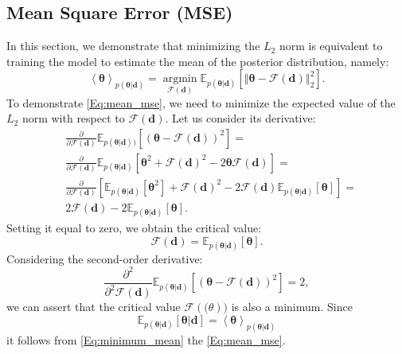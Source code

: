 \documentclass{aa}
\begin{document}
\begin{appendix}
\section{Mean Square Error (MSE)}\label{Sec:appendix_Mean Square Error}
In this section, we demonstrate that minimizing the $L_2$ norm is equivalent to training the model to estimate the mean of the posterior distribution, namely:
\begin{equation}\label{Eq:mean_mse}
\left \langle \bm {\theta} \right \rangle_{p(\bm {\theta}|\bm{d})}=\operatorname*{argmin}_{\mathcal{F}(\bm{d})}\mathbb{E}_{p(\bm {\theta}|\bm {d})}[\left\Vert \bm {\theta}-\mathcal{F}(\bm{d})
 \right \Vert_{2}^{2}].
\end{equation}
To demonstrate \autoref{Eq:mean_mse}, we need to minimize the expected value of the $L_2$ norm with respect to $\mathcal{F}(\bm{d})$. Let us consider its derivative:
\begin{align}\label{Eq:moment_1}
   & \frac{\partial}{\partial \mathcal{F}(\bm{d}) }  \mathbb{E}_{p(\bm {\theta}|\bm{d}))}[(\bm {\theta}-\mathcal{F}(\bm{d}))^2] =  \\
    &
    \frac{\partial}{\partial \mathcal{F}(\bm{d}) }  \mathbb{E}_{p(\bm {\theta}|\bm {d})}[\bm {\theta}^2+\mathcal{F}(\bm{d})^2-2\bm {\theta}\mathcal{F}(\bm{d})] = \nonumber \\
    &
    \frac{\partial}{\partial \mathcal{F}(\bm{d}) }  [
    \mathbb{E}_{p(\bm {\theta}|\bm {d})}[\bm {\theta}^2]+\mathcal{F}(\bm{d})^2-2\mathcal{F}(\bm{d})\mathbb{E}_{p(\bm {\theta}|\bm {d})}[\bm {\theta}]]= \nonumber \\
    &2\mathcal{F}(\bm{d})-2 \mathbb{E}_{p(\bm {\theta}|\bm {d})}[\bm {\theta}]. \nonumber
\end{align}
Setting it equal to zero, we obtain the critical value:
\begin{equation}
    \mathcal{F}(\bm{d})= \mathbb{E}_{p(\bm {\theta}|\bm {d})}[\bm {\theta}]. 
\end{equation}
Considering the second-order derivative:
\begin{equation}\label{Eq:minimum_mean}
   \frac{\partial^2}{\partial^2 \mathcal{F}(\bm{d})}  \mathbb{E}_{p(\bm {\theta}|\bm {d})}[(\bm {\theta}-\mathcal{F}(\bm{d}))^2]=2, 
\end{equation}
we can assert that the critical value $\mathcal{F(\bm(\theta))}$ is also a minimum. 
Since 
\begin{equation}
    \mathbb{E}_{p(\bm {\theta}|\bm {d})}[\bm {\theta}|\bm{d}]= \left \langle \bm {\theta} \right \rangle_{p(\bm {\theta}|\bm{d})}
\end{equation}
it follows from \autoref{Eq:minimum_mean} the \autoref{Eq:mean_mse}.

\end{appendix}
\end{document}
